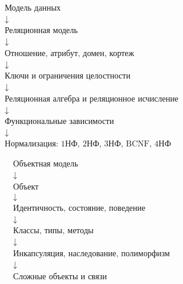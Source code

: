 \documentclass[12pt,a4paper]{article}
\theoremstyle{remark}
\begin{document}
\[
\begin{array}{c}
\text{Модель данных} \\
\downarrow \\
\text{Реляционная модель} \\
\downarrow \\
\text{Отношение, атрибут, домен, кортеж} \\
\downarrow \\
\text{Ключи и ограничения целостности} \\
\downarrow \\
\text{Реляционная алгебра и реляционное исчисление} \\
\downarrow \\
\text{Функциональные зависимости} \\
\downarrow \\
\text{Нормализация: 1НФ, 2НФ, 3НФ, BCNF, 4НФ}
\end{array}
\]

\[
\begin{array}{c}
\text{Объектная модель} \\
\downarrow \\
\text{Объект} \\
\downarrow \\
\text{Идентичность, состояние, поведение} \\
\downarrow \\
\text{Классы, типы, методы} \\
\downarrow \\
\text{Инкапсуляция, наследование, полиморфизм} \\
\downarrow \\
\text{Сложные объекты и связи}
\end{array}
\]
\end{document}
